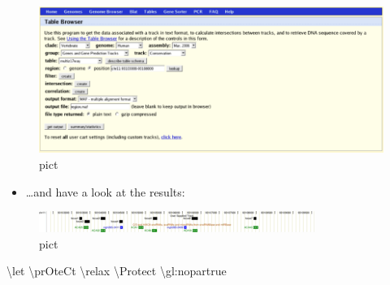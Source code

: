 \documentclass[]{article}
\providecommand{\tightlist}{%
  \setlength{\itemsep}{0pt}\setlength{\parskip}{0pt}}
\begin{document}
\begin{figure}[htbp]
\centering
\includegraphics{Figs/table-browser.png}
\caption{pict}
\end{figure}

\begin{itemize}
\tightlist
\item
  \ldots{}and have a look at the results:
\end{itemize}

\begin{figure}[htbp]
\centering
\includegraphics{Figs/snos.png}
\caption{pict}
\end{figure}

\textbackslash{}let \textbackslash{}prOteCt \textbackslash{}relax
\textbackslash{}Protect \textbackslash{}gl:nopartrue
\end{document}
